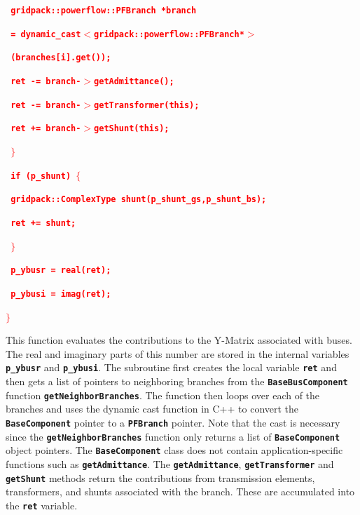 \documentclass[12pt]{report} %
\begin{document}
\textcolor{red}{\texttt{\textbf{    gridpack::powerflow::PFBranch *branch}}}

\textcolor{red}{\texttt{\textbf{      = dynamic\_cast$\boldsymbol{\mathrm{<}}$gridpack::powerflow::PFBranch*$\boldsymbol{\mathrm{>}}$}}}

\textcolor{red}{\texttt{\textbf{        (branches[i].get());}}}

\textcolor{red}{\texttt{\textbf{    ret -= branch-$\boldsymbol{\mathrm{>}}$getAdmittance();}}}

\textcolor{red}{\texttt{\textbf{    ret -= branch-$\boldsymbol{\mathrm{>}}$getTransformer(this);}}}

\textcolor{red}{\texttt{\textbf{    ret += branch-$\boldsymbol{\mathrm{>}}$getShunt(this);}}}

\textcolor{red}{\texttt{\textbf{  $\boldsymbol{\mathrm{\}}}$}}}

\textcolor{red}{\texttt{\textbf{  if (p\_shunt) $\boldsymbol{\mathrm{\{}}$}}}

\textcolor{red}{\texttt{\textbf{    gridpack::ComplexType shunt(p\_shunt\_gs,p\_shunt\_bs);}}}

\textcolor{red}{\texttt{\textbf{    ret += shunt;}}}

\textcolor{red}{\texttt{\textbf{  $\boldsymbol{\mathrm{\}}}$}}}

\textcolor{red}{\texttt{\textbf{  p\_ybusr = real(ret);}}}

\textcolor{red}{\texttt{\textbf{  p\_ybusi = imag(ret);}}}

\textcolor{red}{\texttt{\textbf{$\boldsymbol{\mathrm{\}}}$}}}

This function evaluates the contributions to the Y-Matrix associated with buses. The real and imaginary parts of this number are stored in the internal variables \texttt{\textbf{p\_ybusr}} and \texttt{\textbf{p\_ybusi}}. The subroutine first creates the local variable \texttt{\textbf{ret}} and then gets a list of pointers to neighboring branches from the \texttt{\textbf{BaseBusComponent}} function \texttt{\textbf{getNeighborBranches}}. The function then loops over each of the branches and uses the dynamic cast function in C++ to convert the \texttt{\textbf{BaseComponent}} pointer to a \texttt{\textbf{PFBranch}} pointer. Note that the cast is necessary since the \texttt{\textbf{getNeighborBranches}} function only returns a list of \texttt{\textbf{BaseComponent}} object pointers. The \texttt{\textbf{BaseComponent}} class does not contain application-specific functions such as \texttt{\textbf{getAdmittance}}. The \texttt{\textbf{getAdmittance}}, \texttt{\textbf{getTransformer}} and \texttt{\textbf{getShunt}} methods return the contributions from transmission elements, transformers, and shunts associated with the branch. These are accumulated into the \texttt{\textbf{ret}} variable.
\end{document}
